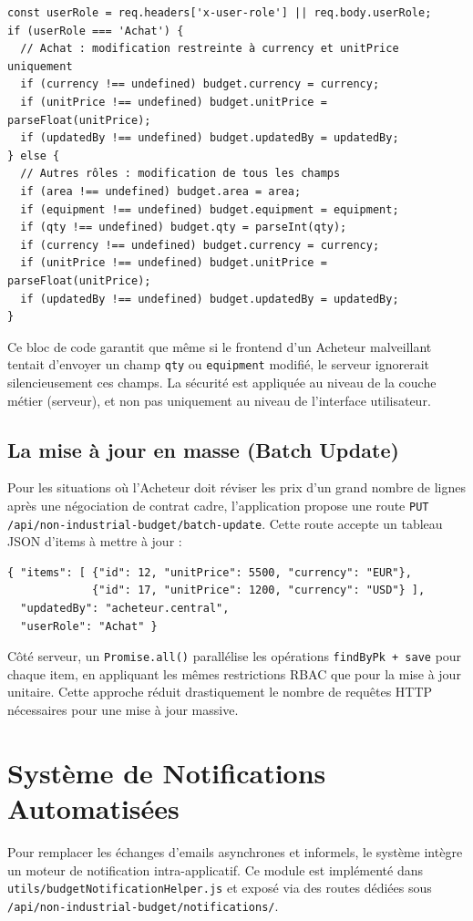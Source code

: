 \begin{verbatim}
const userRole = req.headers['x-user-role'] || req.body.userRole;
if (userRole === 'Achat') {
  // Achat : modification restreinte à currency et unitPrice uniquement
  if (currency !== undefined) budget.currency = currency;
  if (unitPrice !== undefined) budget.unitPrice = parseFloat(unitPrice);
  if (updatedBy !== undefined) budget.updatedBy = updatedBy;
} else {
  // Autres rôles : modification de tous les champs
  if (area !== undefined) budget.area = area;
  if (equipment !== undefined) budget.equipment = equipment;
  if (qty !== undefined) budget.qty = parseInt(qty);
  if (currency !== undefined) budget.currency = currency;
  if (unitPrice !== undefined) budget.unitPrice = parseFloat(unitPrice);
  if (updatedBy !== undefined) budget.updatedBy = updatedBy;
}
\end{verbatim}

Ce bloc de code garantit que même si le frontend d'un Acheteur malveillant tentait d'envoyer un champ \texttt{qty} ou \texttt{equipment} modifié, le serveur ignorerait silencieusement ces champs. La sécurité est appliquée au niveau de la couche métier (serveur), et non pas uniquement au niveau de l'interface utilisateur.

\subsection{La mise à jour en masse (Batch Update)}
Pour les situations où l'Acheteur doit réviser les prix d'un grand nombre de lignes après une négociation de contrat cadre, l'application propose une route \texttt{PUT /api/non-industrial-budget/batch-update}. Cette route accepte un tableau JSON d'items à mettre à jour :

\begin{verbatim}
{ "items": [ {"id": 12, "unitPrice": 5500, "currency": "EUR"},
             {"id": 17, "unitPrice": 1200, "currency": "USD"} ],
  "updatedBy": "acheteur.central",
  "userRole": "Achat" }
\end{verbatim}

Côté serveur, un \texttt{Promise.all()} parallélise les opérations \texttt{findByPk + save} pour chaque item, en appliquant les mêmes restrictions RBAC que pour la mise à jour unitaire. Cette approche réduit drastiquement le nombre de requêtes HTTP nécessaires pour une mise à jour massive.

\section{Système de Notifications Automatisées}
Pour remplacer les échanges d'emails asynchrones et informels, le système intègre un moteur de notification intra-applicatif. Ce module est implémenté dans \texttt{utils/budgetNotificationHelper.js} et exposé via des routes dédiées sous \texttt{/api/non-industrial-budget/notifications/}.

